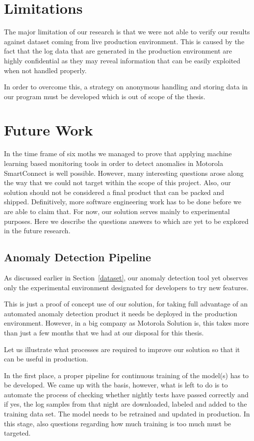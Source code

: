 \section{Limitations}
The major limitation of our research is that we were not able to verify our results against dataset coming from live production environment. 
This is caused by the fact that the log data that are generated in the production environment are highly confidential as they may reveal information that can be easily exploited when not handled properly. 

In order to overcome this, a strategy on anonymous handling and storing data in our program must be developed which is out of scope of the thesis.

\section{Future Work}
In the time frame of six moths we managed to prove that applying machine learning based monitoring tools in order to detect anomalies in Motorola SmartConnect is well possible.
However, many interesting questions arose along the way that we could not target within the scope of this project.
Also, our solution should not be considered a final product that can be packed and shipped. Definitively, more software engineering work has to be done before we are able to claim that. For now, our solution serves mainly to experimental purposes.
Here we describe the questions answers to which are yet to be explored in the future research.

\subsection{Anomaly Detection Pipeline}
\label{future:pipeline}
As discussed earlier in Section~\ref{dataset}, our anomaly detection tool yet observes only the experimental environment designated for developers to try new features. 

This is just a proof of concept use of our solution, for taking full advantage of an automated anomaly detection product it needs be deployed in the production environment. However, in a big company as Motorola Solution is, this takes more than just a few months that we had at our disposal for this thesis.

Let us illustrate what processes are required to improve our solution so that it can be useful in production.

In the first place, a proper pipeline for continuous training of the model(s) has to be developed. We came up with the basis, however, what is left to do is to automate the process of checking whether nightly tests have passed correctly and if yes, the log samples from that night are downloaded, labeled and added to the training data set. The model needs to be retrained and updated in production. In this stage, also questions regarding how much training is too much must be targeted.

